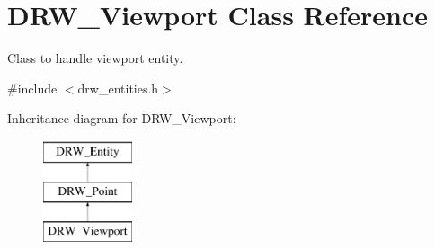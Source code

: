 \hypertarget{class_d_r_w___viewport}{}\section{D\+R\+W\+\_\+\+Viewport Class Reference}
\label{class_d_r_w___viewport}


Class to handle viewport entity.  




{\ttfamily \#include $<$drw\+\_\+entities.\+h$>$}

Inheritance diagram for D\+R\+W\+\_\+\+Viewport\+:\begin{figure}[H]
\begin{center}
\leavevmode
\includegraphics[height=3.000000cm]{da/d35/class_d_r_w___viewport}
\end{center}
\end{figure}

